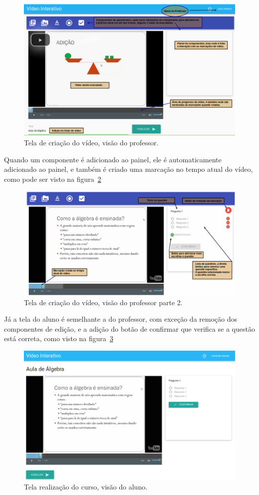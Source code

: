 \begin{figure}[h]
    \centering
    \includegraphics[keepaspectratio=true,scale=0.4]{figuras/tela_sistema_2.png}
    \caption{Tela de criação do vídeo, visão do professor.}
    \label{fig:tela-sistema-2}
\end{figure}

Quando um componente é adicionado ao painel, ele é automaticamente adicionado ao painel, e também é criado uma marcação no tempo atual do vídeo, como pode ser visto na figura~\ref{fig:tela-sistema-3}

\begin{figure}[h]
    \centering
    \includegraphics[keepaspectratio=true,scale=0.4]{figuras/tela_sistema_3.png}
    \caption{Tela de criação do vídeo, visão do professor parte 2.}
    \label{fig:tela-sistema-3}
\end{figure}

Já a tela do aluno é semelhante a do professor, com exceção da remoção dos componentes de edição, e a adição do botão de confirmar que verifica se a questão está correta, como visto na figura~\ref{fig:tela-sistema-4}

\begin{figure}[htbp]
    \centering
    \includegraphics[keepaspectratio=true,scale=0.4]{figuras/tela_sistema_4.png}
    \caption{Tela realização do curso, visão do aluno.}
    \label{fig:tela-sistema-4}
\end{figure}
